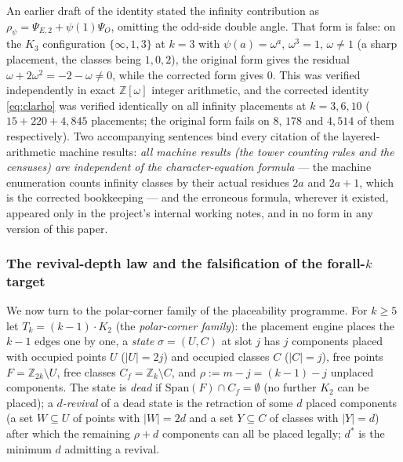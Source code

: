 \begin{remark}\label{rem:clafourierfix}
An earlier draft of the identity stated the infinity contribution as
$\rho_\psi=\Psi_{E,2}+\psi(1)\Psi_O$, omitting the odd-side double angle.
That form is false: on the $K_3$ configuration $\{\infty,1,3\}$ at $k=3$
with $\psi(a)=\omega^a$, $\omega^3=1$, $\omega\ne1$ (a sharp placement,
the classes being $1,0,2$), the original form gives the residual
$\omega+2\omega^2=-2-\omega\neq0$, while the corrected form gives $0$.
This was verified independently in exact $\mathbb{Z}[\omega]$ integer
arithmetic, and the corrected identity \eqref{eq:clarho} was verified
identically on all infinity placements at $k=3,6,10$ ($15+220+4{,}845$
placements; the original form fails on $8$, $178$ and $4{,}514$ of them
respectively). Two accompanying sentences bind every citation of the
layered-arithmetic machine results: \emph{all machine results (the tower
counting rules and the censuses) are independent of the character-equation
formula} --- the machine enumeration counts infinity classes by their
actual residues $2a$ and $2a+1$, which is the corrected bookkeeping ---
and the erroneous formula, wherever it existed, appeared only in the
project's internal working notes, and in no form in any version of this
paper.
\end{remark}

\subsubsection{The revival-depth law and the falsification of the
forall-\texorpdfstring{$k$}{k} target}\label{subsubsec:revdepth}

We now turn to the polar-corner family of the placeability programme. For
$k\ge5$ let $T_k=(k-1)\cdot K_2$ (the \emph{polar-corner family}): the
placement engine places the $k-1$ edges one by one, a \emph{state}
$\sigma=(U,C)$ at slot $j$ has $j$ components placed with occupied points
$U$ ($|U|=2j$) and occupied classes $C$ ($|C|=j$), free points
$F=\mathbb{Z}_{2k}\setminus U$, free classes $C_f=\mathbb{Z}_k\setminus C$,
and $\rho:=m-j=(k-1)-j$ unplaced components. The state is \emph{dead} if
$\mathrm{Span}(F)\cap C_f=\emptyset$ (no further $K_2$ can be placed); a
\emph{$d$-revival} of a dead state is the retraction of some $d$ placed
components (a set $W\subseteq U$ of points with $|W|=2d$ and a set
$Y\subseteq C$ of classes with $|Y|=d$) after which the remaining
$\rho+d$ components can all be placed legally; $d^*$ is the minimum $d$
admitting a revival.

